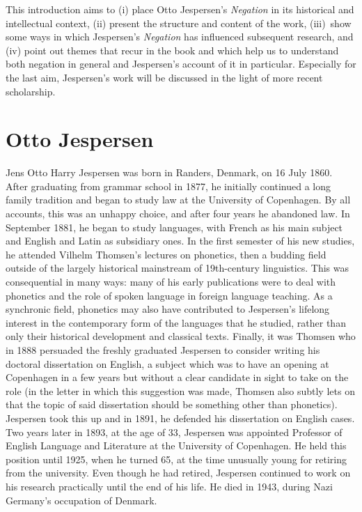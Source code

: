 \documentclass[output=chapter]{langscibook}
\begin{document}
This introduction aims to (i) place Otto Jespersen’s \textit{Negation} in its historical and intellectual context, (ii) present the structure and content of the work, %
(iii)~show some ways in which Jespersen’s \textit{Negation} has influenced subsequent research, and (iv) point out themes that recur in the book and which help us to understand both negation in general and %
Jespersen’s account of it in particular. Especially for the last aim, Jespersen’s work will be discussed in the light of more recent scholarship. %

\section{Otto Jespersen}

Jens Otto Harry Jespersen was born in Randers, Denmark, on 16 July 1860. After graduating from grammar school in 1877, he initially continued a long family tradition and began to study law at the University of Copenhagen. By all accounts, this was an unhappy choice, and after four years he abandoned law. In September 1881, he began to study languages, with French as his main subject and English and Latin as subsidiary ones. In the first semester of his new studies, he attended Vilhelm Thomsen’s lectures on phonetics, then a budding field outside of the largely historical mainstream of 19th-century linguistics. This was consequential in many ways: many of his early publications were to deal with phonetics and the role of spoken language in foreign language teaching. As a synchronic field, phonetics may also have contributed to Jespersen’s lifelong interest in the contemporary form of the languages that he studied, rather than only their historical development and classical texts. Finally, it was %
Thomsen who in 1888 persuaded the freshly graduated Jespersen to consider writing his doctoral dissertation on English, a subject which was to have an opening at Copenhagen in a few years but without a clear candidate in sight to take on the role (in the letter in which this suggestion was made, Thomsen also subtly lets on that the topic of said dissertation should be something other than phonetics). Jespersen took this up and in 1891, he defended his dissertation on English cases. Two years later in 1893, at the age of 33, Jespersen was appointed Professor of English Language and Literature at the University of Copenhagen. He held this position until 1925, when he turned 65, at the time unusually young %
for retiring from the university. Even though he had retired, Jespersen continued to work on his research practically until the end of his life. He died in 1943, during Nazi Germany’s occupation of Denmark.
\end{document}
